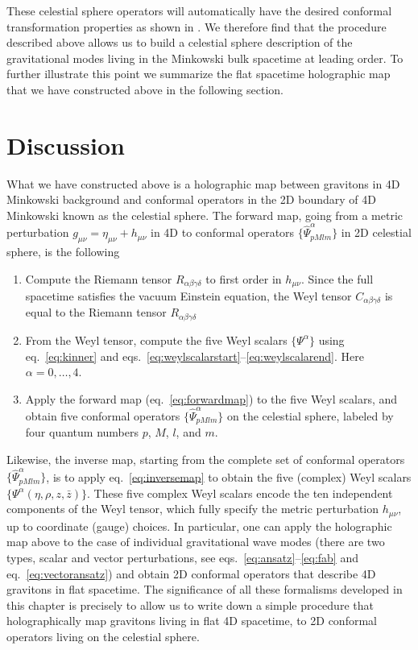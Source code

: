 \documentclass{brownthesis}
\begin{document}
These celestial sphere operators will automatically have the desired
conformal transformation properties as shown in \cite{Liu:2021tif}.
We therefore find that the procedure described above allows us to
build a celestial sphere description of the gravitational modes living
in the Minkowski bulk spacetime at leading order. To further illustrate
this point we summarize the flat spacetime holographic map that we
have constructed above in the following section.

\section{Discussion}

What we have constructed above is a holographic map between gravitons
in 4D Minkowski background and conformal operators in the 2D boundary
of 4D Minkowski known as the celestial sphere. The forward map, going
from a metric perturbation $g_{\mu\nu}=\eta_{\mu\nu}+h_{\mu\nu}$
in 4D to conformal operators $\{\hat{\Psi}_{pMlm}^{\alpha}\}$ in
2D celestial sphere, is the following
\begin{enumerate}
\item Compute the Riemann tensor $R_{\alpha\beta\gamma\delta}$ to first
order in $h_{\mu\nu}$. Since the full spacetime satisfies the vacuum
Einstein equation, the Weyl tensor $C_{\alpha\beta\gamma\delta}$
is equal to the Riemann tensor $R_{\alpha\beta\gamma\delta}$
\item From the Weyl tensor, compute the five Weyl scalars $\{\Psi^{\alpha}\}$
using eq.~\ref{eq:kinner} and eqs.~\ref{eq:weylscalarstart}--\ref{eq:weylscalarend}.
Here $\alpha=0,\ldots,4$.
\item Apply the forward map (eq.~\ref{eq:forwardmap}) to the five Weyl
scalars, and obtain five conformal operators $\{\hat{\Psi}_{pMlm}^{\alpha}\}$
on the celestial sphere, labeled by four quantum numbers $p$, $M$,
$l$, and $m$.
\end{enumerate}
Likewise, the inverse map, starting from the complete set of conformal
operators $\{\hat{\Psi}_{pMlm}^{\alpha}\}$, is to apply eq.~\ref{eq:inversemap}
to obtain the five (complex) Weyl scalars $\{\Psi^{\alpha}(\eta,\rho,z,\bar{z})\}$.
These five complex Weyl scalars encode the ten independent components
of the Weyl tensor, which fully specify the metric perturbation $h_{\mu\nu}$,
up to coordinate (gauge) choices. In particular, one can apply the
holographic map above to the case of individual gravitational wave
modes (there are two types, scalar and vector perturbations, see eqs.~\ref{eq:ansatz}--\ref{eq:fab}
and eq.~\ref{eq:vectoransatz}) and obtain 2D conformal operators
that describe 4D gravitons in flat spacetime. The significance of
all these formalisms developed in this chapter is precisely to allow
us to write down a simple procedure that holographically map gravitons
living in flat 4D spacetime, to 2D conformal operators living on the
celestial sphere.
\end{document}
